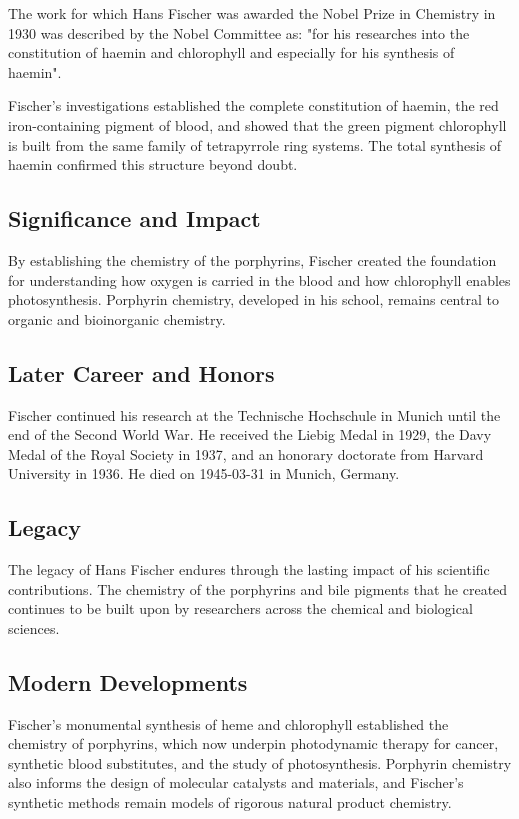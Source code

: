 The work for which Hans Fischer was awarded the Nobel Prize in Chemistry in 1930 was described by the Nobel Committee as: "for his researches into the constitution of haemin and chlorophyll and especially for his synthesis of haemin".

Fischer's investigations established the complete constitution of haemin, the red iron-containing pigment of blood, and showed that the green pigment chlorophyll is built from the same family of tetrapyrrole ring systems.
The total synthesis of haemin confirmed this structure beyond doubt.

\subsection*{Significance and Impact}

By establishing the chemistry of the porphyrins, Fischer created the foundation for understanding how oxygen is carried in the blood and how chlorophyll enables photosynthesis.
Porphyrin chemistry, developed in his school, remains central to organic and bioinorganic chemistry.

\subsection*{Later Career and Honors}

Fischer continued his research at the Technische Hochschule in Munich until the end of the Second World War.
He received the Liebig Medal in 1929, the Davy Medal of the Royal Society in 1937, and an honorary doctorate from Harvard University in 1936.
He died on 1945-03-31 in Munich, Germany.

\subsection*{Legacy}

The legacy of Hans Fischer endures through the lasting impact of his scientific contributions.
The chemistry of the porphyrins and bile pigments that he created continues to be built upon by researchers across the chemical and biological sciences.

\subsection*{Modern Developments}

Fischer's monumental synthesis of heme and chlorophyll established the chemistry of porphyrins, which now underpin photodynamic therapy for cancer, synthetic blood substitutes, and the study of photosynthesis. Porphyrin chemistry also informs the design of molecular catalysts and materials, and Fischer's synthetic methods remain models of rigorous natural product chemistry.


